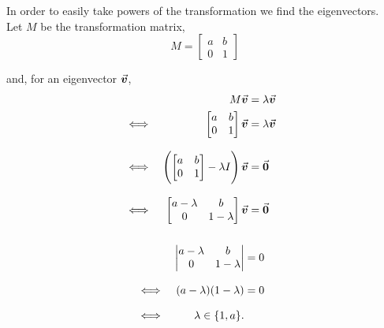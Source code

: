 \documentclass[../MathsNotesBase.tex]{subfiles}
\begin{document}
{		\bigskip
		In order to easily take powers of the transformation we find the eigenvectors.\\
		
		Let $M$ be the transformation matrix,
		\[ M = \begin{bmatrix}
				a & b\\
				0 & 1
			\end{bmatrix}
		\]
		
		and, for an eigenvector $\vec{\bm{v}}$,
		\begin{align*}
		&& M \vec{\bm{v}} &= \lambda \vec{\bm{v}} \\
		&\iff & 
		\begin{bmatrix}
		a & b\\
		0 & 1
		\end{bmatrix} \vec{\bm{v}} &= \lambda \vec{\bm{v}} \\[8pt]
		&\iff & \left(
		\begin{bmatrix}
		a & b\\
		0 & 1
		\end{bmatrix} - \lambda I \right) \vec{\bm{v}} &= \vec{\bm{0}} &\text{\scriptsize{}} \\[8pt]
		&\iff &
		\begin{bmatrix}
		a-\lambda & b\\
		0 & 1-\lambda
		\end{bmatrix} \vec{\bm{v}} &= \vec{\bm{0}} &\text{\scriptsize{}} \\[8pt]
		\end{align*}
	
		\begin{align*}
		&& 
		\begin{vmatrix}
		a-\lambda & b\\
		0 & 1-\lambda
		\end{vmatrix} &= 0 \\[8pt]
		&\iff & (a - \lambda)(1 - \lambda) &= 0 &\text{\scriptsize{}} \\[8pt]
		&\iff & \lambda \in \{1, a\}.
		\end{align*}
		
}
\end{document}
